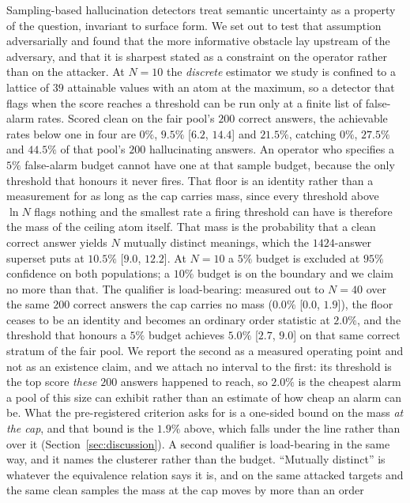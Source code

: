 Sampling-based hallucination detectors treat semantic uncertainty as a property of the
question, invariant to surface form. We set out to test that assumption adversarially and
found that the more informative obstacle lay upstream of the adversary, and that it is
sharpest stated as a constraint on the operator rather than on the attacker. At $N{=}10$ the
\emph{discrete} estimator we study is confined to a lattice of $39$ attainable values with
an atom at the maximum, so a detector that flags when the score reaches a threshold can be
run only at a finite list of false-alarm rates. Scored clean on the fair pool's $200$
correct answers, the achievable rates below one in four are $0\%$, $9.5\%$ [$6.2$, $14.4$]
and $21.5\%$, catching $0\%$, $27.5\%$ and $44.5\%$ of that pool's $200$ hallucinating
answers. An operator who specifies a $5\%$ false-alarm budget cannot have one at that sample
budget, because the only threshold that honours it never fires. That floor is an identity
rather than a measurement for as long as the cap carries mass, since every threshold above
$\ln N$ flags nothing and the smallest rate a firing threshold can have is therefore the
mass of the ceiling atom itself. That mass is the probability that a clean correct answer
yields $N$ mutually distinct meanings, which the $1424$-answer superset puts at $10.5\%$
[$9.0$, $12.2$]. At $N{=}10$ a $5\%$ budget is excluded at $95\%$ confidence on both
populations; a $10\%$ budget is on the boundary and we claim no more than that. The
qualifier is load-bearing: measured out to $N{=}40$ over the same $200$ correct answers the
cap carries no mass ($0.0\%$ [$0.0$, $1.9$]), the floor ceases to be an identity and becomes
an ordinary order statistic at $2.0\%$, and the threshold that honours a $5\%$ budget
achieves $5.0\%$ [$2.7$, $9.0$] on that same correct stratum of the fair pool. We report the
second as a measured operating point and not as an existence claim, and we attach no
interval to the first: its threshold is the top score \emph{these} $200$ answers happened to
reach, so $2.0\%$ is the cheapest alarm a pool of this size can exhibit rather than an
estimate of how cheap an alarm can be. What the pre-registered criterion asks for is a
one-sided bound on the mass \emph{at the cap}, and that bound is the $1.9\%$ above, which
falls under the line rather than over it (Section~\ref{sec:discussion}). A second qualifier
is load-bearing in the same way, and it names the clusterer rather than the budget.
``Mutually distinct'' is whatever the equivalence relation says it is, and on the same
attacked targets and the same clean samples the mass at the cap moves by more than an order
